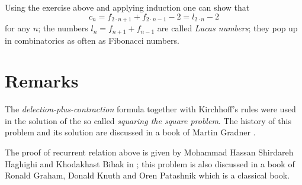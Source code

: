 Using the exercise above and applying induction one can show that 
\[c_n=f_{2\cdot n+1}+f_{2\cdot n-1}-2=l_{2\cdot  n}-2\]
for any $n$;
the numbers $l_n=f_{n+1}+f_{n-1}$ are called \emph{Lucas numbers};
they pop up in combinatorics as often as Fibonacci numbers.  

\section*{Remarks}

The \emph{delection-plus-contraction} formula together with Kirchhoff's rules were used in the solution of the so called \emph{squaring the square problem}.
The history of this problem and its solution are discussed in a book of Martin Gradner \cite[Chapter 17]{gardner}.

The proof of recurrent relation above is given by Mohammad Hassan Shirdareh Haghighi and Khodakhast Bibak in \cite{haghighi-bibak};
this problem is also discussed in a book of  Ronald Graham, Donald Knuth and Oren Patashnik \cite{knut} which is a classical book.

